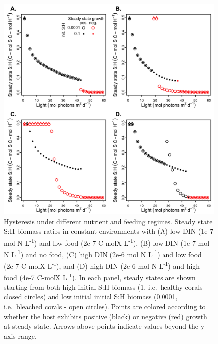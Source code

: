 \documentclass[]{elsarticle} %
\makeatletter
\def\maxwidth{\ifdim\Gin@nat@width>\linewidth\linewidth
\else\Gin@nat@width\fi}
\let\Oldincludegraphics\includegraphics
\renewcommand{\includegraphics}[1]{\Oldincludegraphics[width=\maxwidth]{#1}}
\makeatother
\begin{document}
\begin{figure}[htbp]
\centering
\includegraphics{../img/Fig8.png}
\caption{Hysteresis under different nutrient and feeding regimes. Steady
state S:H biomass ratios in constant environments with (A) low DIN (1e-7
mol N L\textsuperscript{-1}) and low food (2e-7 C-molX
L\textsuperscript{-1}), (B) low DIN (1e-7 mol N L\textsuperscript{-1})
and no food, (C) high DIN (2e-6 mol N L\textsuperscript{-1}) and low
food (2e-7 C-molX L\textsuperscript{-1}), and (D) high DIN (2e-6 mol N
L\textsuperscript{-1}) and high food (4e-7 C-molX
L\textsuperscript{-1}). In each panel, steady states are shown starting
from both high initial S:H biomass (1, i.e.~healthy corals - closed
circles) and low initial initial S:H biomass (0.0001, i.e.~bleached
corals - open circles). Points are colored according to whether the host
exhibits positive (black) or negative (red) growth at steady state.
Arrows above points indicate values beyond the y-axis range.}
\end{figure}
\end{document}
